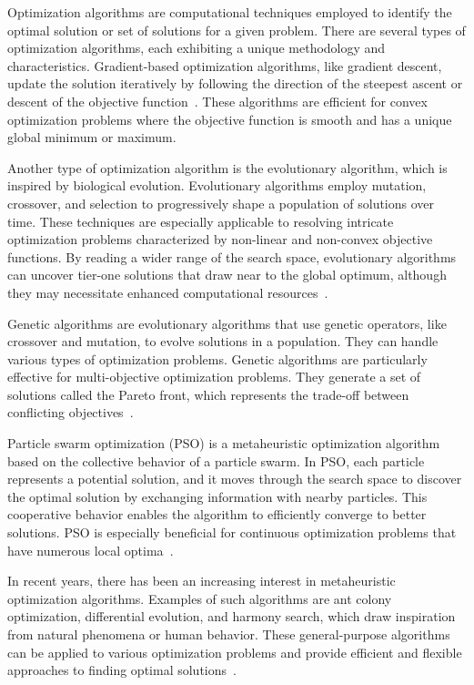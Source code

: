 Optimization algorithms are computational techniques employed to identify the optimal solution or set of solutions for a given problem. There are several types of optimization algorithms, each exhibiting a unique methodology and characteristics. Gradient-based optimization algorithms, like gradient descent, update the solution iteratively by following the direction of the steepest ascent or descent of the objective function~\cite{Ruder.2017}. These algorithms are efficient for convex optimization problems where the objective function is smooth and has a unique global minimum or maximum.

Another type of optimization algorithm is the evolutionary algorithm, which is inspired by biological evolution. Evolutionary algorithms employ mutation, crossover, and selection to progressively shape a population of solutions over time. These techniques are especially applicable to resolving intricate optimization problems characterized by non-linear and non-convex objective functions. By reading a wider range of the search space, evolutionary algorithms can uncover tier-one solutions that draw near to the global optimum, although they may necessitate enhanced computational resources~\cite{Back.1993}.

Genetic algorithms are evolutionary algorithms that use genetic operators, like crossover and mutation, to evolve solutions in a population. They can handle various types of optimization problems. Genetic algorithms are particularly effective for multi-objective optimization problems. They generate a set of solutions called the Pareto front, which represents the trade-off between conflicting objectives~\cite{Lambora.2019,Katoch.2021}.

Particle swarm optimization (\acrshort{PSO}) is a metaheuristic optimization algorithm based on the collective behavior of a particle swarm. In \acrshort{PSO}, each particle represents a potential solution, and it moves through the search space to discover the optimal solution by exchanging information with nearby particles. This cooperative behavior enables the algorithm to efficiently converge to better solutions. \acrshort{PSO} is especially beneficial for continuous optimization problems that have numerous local optima~\cite{Back.1993}.

In recent years, there has been an increasing interest in metaheuristic optimization algorithms. Examples of such algorithms are ant colony optimization, differential evolution, and harmony search, which draw inspiration from natural phenomena or human behavior. These general-purpose algorithms can be applied to various optimization problems and provide efficient and flexible approaches to finding optimal solutions~\cite{Yang.2011}.


